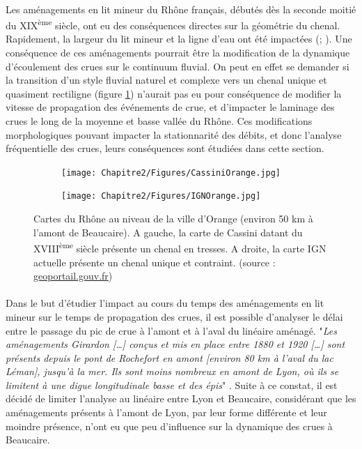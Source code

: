 	\paragraph{} Les aménagements en lit mineur du Rhône français, débutés dès la seconde moitié du XIX\textsuperscript{ème} siècle, ont eu des conséquences directes sur la géométrie du chenal. Rapidement, la largeur du lit mineur et la ligne d'eau ont été impactées (\cite{gaydou_schema_2013}; \cite{piegay_observatoire_2022}). Une conséquence de ces aménagements pourrait être la modification de la dynamique d'écoulement des crues sur le continuum fluvial. On peut en effet se demander si la transition d'un style fluvial naturel et complexe vers un chenal unique et quasiment rectiligne (figure \ref{fig:CartesChenal}) n'aurait pas eu pour conséquence de modifier la vitesse de propagation des événements de crue, et d'impacter le laminage des crues le long de la moyenne et basse vallée du Rhône. Ces modifications morphologiques pouvant impacter la stationnarité des débits, et donc l'analyse fréquentielle des crues, leurs conséquences sont étudiées dans cette section.
	
	\begin{figure}[h]
		\centering
		\begin{subfigure}{0.4\linewidth}
			\texttt{[image: Chapitre2/Figures/CassiniOrange.jpg]}
		\end{subfigure}
		\begin{subfigure}{0.4\linewidth}
			\texttt{[image: Chapitre2/Figures/IGNOrange.jpg]}
		\end{subfigure}
		\caption{Cartes du Rhône au niveau de la ville d'Orange (environ 50 km à l'amont de Beaucaire). A gauche, la carte de Cassini datant du XVIII\textsuperscript{ème} siècle présente un chenal en tresses. A droite, la carte IGN actuelle présente un chenal unique et contraint. (source : \url{geoportail.gouv.fr})}
		\label{fig:CartesChenal}
	\end{figure}
	
	\paragraph{} Dans le but d'étudier l'impact au cours du temps des aménagements en lit mineur sur le temps de propagation des crues, il est possible d'analyser le délai entre le passage du pic de crue à l'amont et à l'aval du linéaire aménagé. "\textit{Les aménagements Girardon […] conçus et mis en place entre 1880 et 1920 […] sont présents depuis le pont de Rochefort en amont [environ 80 km à l'aval du lac Léman], jusqu'à la mer. Ils sont moins nombreux en amont de Lyon, où ils se limitent à une digue longitudinale basse et des épis}" \citep{gaydou_schema_2013}. Suite à ce constat, il est décidé de limiter l'analyse au linéaire entre Lyon et Beaucaire, considérant que les aménagements présents à l'amont de Lyon, par leur forme différente et leur moindre présence, n'ont eu que peu d'influence sur la dynamique des crues à Beaucaire.
	
